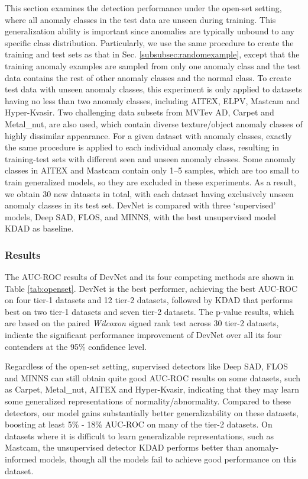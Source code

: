 \documentclass[10pt,journal,compsoc]{IEEEtran}
\begin{document}
This section examines the detection performance under the open-set setting, where all anomaly classes in the test data are unseen during training. This generalization ability is important since anomalies are typically unbound to any specific class distribution. Particularly, we use the same procedure to create the training and test sets as that in Sec. \ref{subsubsec:randomexample}, except that the training anomaly examples are sampled from only one anomaly class and the test data contains the rest of other anomaly classes and the normal class. To create test data with unseen anomaly classes, this experiment is only applied to datasets having no less than two anomaly classes, including AITEX, ELPV, Mastcam and Hyper-Kvasir. Two challenging data subsets from MVTev AD, Carpet and Metal\_nut, are also used, which contain diverse texture/object anomaly classes of highly dissimilar appearance. For a given dataset with  anomaly classes, exactly the same procedure is applied to each individual anomaly class, resulting in  training-test sets with different seen and unseen anomaly classes. Some anomaly classes in AITEX and Mastcam contain only 1--5 samples, which are too small to train generalized models, so they are excluded in these experiments. As a result, we obtain 30 new datasets in total, with each dataset having exclusively unseen anomaly classes in its test set. DevNet is compared with three `supervised' models, Deep SAD, FLOS, and MINNS, with the best unsupervised model KDAD as baseline.

\subsubsection{Results}

The AUC-ROC results of DevNet and its four competing methods are shown in Table \ref{tab:openset}. DevNet is the best performer, achieving the best AUC-ROC on four tier-1 datasets and 12 tier-2 datasets, followed by KDAD that performs best on two tier-1 datasets and seven tier-2 datasets. The p-value results, which are based on the paired \textit{Wilcoxon} signed rank test across 30 tier-2 datasets, indicate the significant performance improvement of DevNet over all its four contenders at the 95\% confidence level.

Regardless of the open-set setting, supervised detectors like Deep SAD, FLOS and MINNS can still obtain quite good AUC-ROC results on some datasets, such as Carpet, Metal\_nut, AITEX and Hyper-Kvasir, indicating that they may learn some generalized representations of normality/abnormality. Compared to these detectors, our model gains substantially better generalizability on these datasets, boosting at least 5\% - 18\% AUC-ROC on many of the tier-2 datasets. On datasets where it is difficult to learn generalizable representations, such as Mastcam, the unsupervised detector KDAD performs better than anomaly-informed models, though all the models fail to achieve good performance on this dataset.
\end{document}
